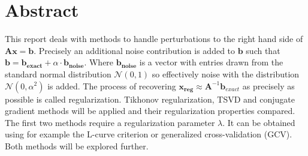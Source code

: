 \section{Abstract}
This report deals with methods to handle perturbations to the right hand side of $\mathbf{Ax} = \mathbf{b}$. Precisely an additional noise contribution is added to $\mathbf{b}$ such that $\mathbf{b} = \mathbf{b_{exact}} + \alpha \cdot \mathbf{b_{noise}}$. Where $\mathbf{b_{noise}}$ is a vector with entries drawn from the standard normal distribution $\mathcal{N}(0,1)$ so effectively noise with the distribution $\mathcal{N}(0,\alpha^2)$ is added. 
The process of recovering $\mathbf{x_{reg}} \approx \mathbf{A}^{-1} \mathbf{b}_{exact}$ as precisely as possible is called regularization. Tikhonov regularization, TSVD and conjugate gradient methods will be applied and their regularization properties compared.
The first two methods require a regularization parameter $\lambda$. It can be obtained using for example the L-curve criterion or generalized cross-validation (GCV). Both methods will be explored further.

